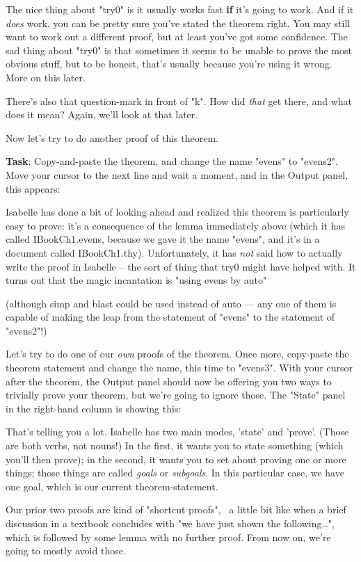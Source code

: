 The nice thing about "try0" is it usually works fast \textbf{if} it's going to work. And if it \textit{does} work, you can be pretty sure you've stated the theorem right. You may still want to work out a different proof, but at least you've got some confidence. The sad thing about "try0" is that sometimes it seems to be unable to prove the most obvious stuff, but to be honest, that's usually because you're using it wrong. More on this later. 

There's also that question-mark in front of "k". How did \textit{that} get there, and what does it mean? Again, we'll look at that later. 

Now let's try to do another proof of this theorem. 

\textbf{Task}: Copy-and-paste the theorem, and change the name "evens" to "evens2". Move your cursor to the next line and wait a moment, and in the Output panel, this appears:

Isabelle has done a bit of looking ahead and realized this theorem is particularly easy to prove: it's a consequence of the lemma immediately above (which it has called IBookCh1.evens, because we gave it the name "evens", and it's in a document called IBookCh1.thy). Unfortunately, it has \textit{not} said how to actually write the proof in Isabelle -- the sort of thing that try0 might have helped with. It turns out that the magic incantation is "using evens by auto"

(although simp and blast could be used instead of auto --- any one of them is capable of making the leap from the statement of "evens" to the statement of "evens2"!)

Let's try to do one of our \textit{own} proofs of the theorem. Once more, copy-paste the theorem statement and change the name, this time to "evens3". With your cursor after the theorem, the Output panel should now be offering you two ways to trivially prove your theorem, but we're going to ignore those. The "State" panel in the right-hand column is showing this:

That's telling you a lot. Isabelle has two main modes, 'state' and 'prove'. (Those are both verbs, not nouns!) In the first, it wants you to state something (which you'll then prove); in the second, it wants you to set about proving one or more things; those things are called \textit{goals} or \textit{subgoals}. In this particular case, we have one goal, which is our current theorem-statement. 

Our prior two proofs are kind of "shortcut proofs",  a little bit like when a brief discussion in a textbook concludes with "we have just shown the following…", which is followed by some lemma with no further proof. From now on, we're going to mostly avoid those. 

